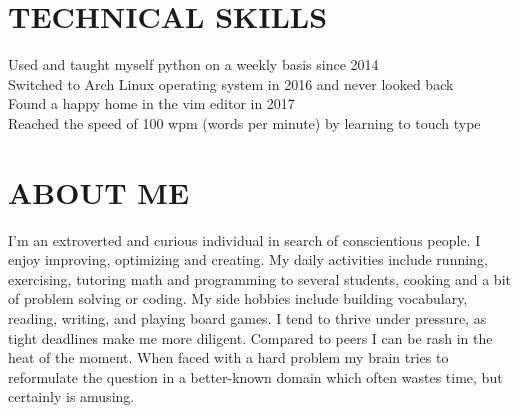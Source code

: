 \documentclass{article}
\begin{document}
\section{TECHNICAL SKILLS}
Used and taught myself python on a weekly basis since 2014\\
Switched to Arch Linux operating system in 2016 and never looked back\\
Found a happy home in the vim editor in 2017\\
Reached the speed of 100 wpm (words per minute) by learning to touch type\\

\section{ABOUT ME}
I'm an extroverted and curious individual in search of conscientious people.
I enjoy improving, optimizing and creating.
My daily activities include running, exercising, tutoring math and programming to several students, cooking and a bit of problem solving or coding.
My side hobbies include building vocabulary, reading, writing, and playing board games.
I tend to thrive under pressure, as tight deadlines make me more diligent.
Compared to peers I can be rash in the heat of the moment.
When faced with a hard problem my brain tries to reformulate the question in a better-known domain which often wastes time, but certainly is amusing.
\end{document}
